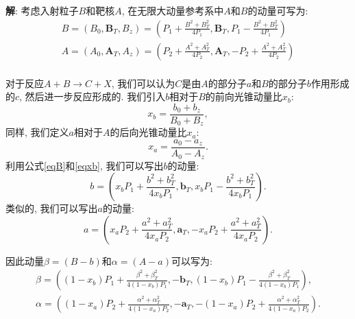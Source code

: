 \documentclass{ctexart}
\newenvironment{answer}{\textbf{解}:}{
\vspace{0.5cm}
}
\begin{document}
\begin{answer}
  考虑入射粒子$B$和靶核$A$, 在无限大动量参考系中$A$和$B$的动量可写为:
  \begin{gather} \label{eqB}
    B = (B_0, \bm{B}_T, B_z) = (P_1 + \frac{B^2+B_T^2}{4P_1}, \bm{B}_T, P_1 - \frac{B^2+B_T^2}{4P_1}) \\ \label{eqA}
    A = (A_0, \bm{A}_T, A_z) = (P_2 + \frac{A^2+A_T^2}{4P_2}, \bm{A}_T, -P_2 + \frac{A^2+A_T^2}{4P_2}) \\
  \end{gather}

对于反应$A + B \rightarrow C + X$, 我们可以认为$C$是由$A$的部分子$a$和$B$的部分子$b$作用形成的$c$, 然后进一步反应形成的. 
我们引入$b$相对于$B$的前向光锥动量比$x_b$:
\begin{equation} \label{eqxb}
  x_b = \frac{b_0 + b_z}{B_0 + B_z}, 
\end{equation}
同样, 我们定义$a$相对于$A$的后向光锥动量比$x_a$:
\begin{equation} \label{eqxa}
  x_a = \frac{a_0 - a_z}{A_0 - A_z}.
\end{equation}
利用公式\eqref{eqB}和\eqref{eqxb}, 我们可以写出$b$的动量:
\begin{equation}
  b = \left(  x_bP_1 + \frac{b^2+b_T^2}{4x_bP_1}, \bm{b}_T, x_bP_1 - \frac{b^2+b_T^2}{4x_bP_1} \right). 
\end{equation}
类似的, 我们可以写出$a$的动量:
\begin{equation}
  a = \left(  x_aP_2 + \frac{a^2+a_T^2}{4x_aP_2}, \bm{a}_T, -x_aP_2 + \frac{a^2+a_T^2}{4x_aP_2} \right). 
\end{equation}

因此动量$\beta = (B - b)$和$\alpha = (A - a)$可以写为:
\begin{gather} \label{eqbeta}
  \beta = \left(  (1-x_b)P_1 + \frac{\beta^2+\beta_T^2}{4(1-x_b)P_1}, -\bm{b}_T, (1-x_b)P_1 - \frac{\beta^2+\beta_T^2}{4(1-x_b)P_1} \right),  \\ \label{eqalpha}
  \alpha = \left(  (1-x_a)P_2 + \frac{\alpha^2+\alpha_T^2}{4(1-x_a)P_2}, -\bm{a}_T, -(1-x_a)P_2 + \frac{\alpha^2+\alpha_T^2}{4(1-x_a)P_2} \right).  \\
\end{gather}


\end{answer}
\end{document}
